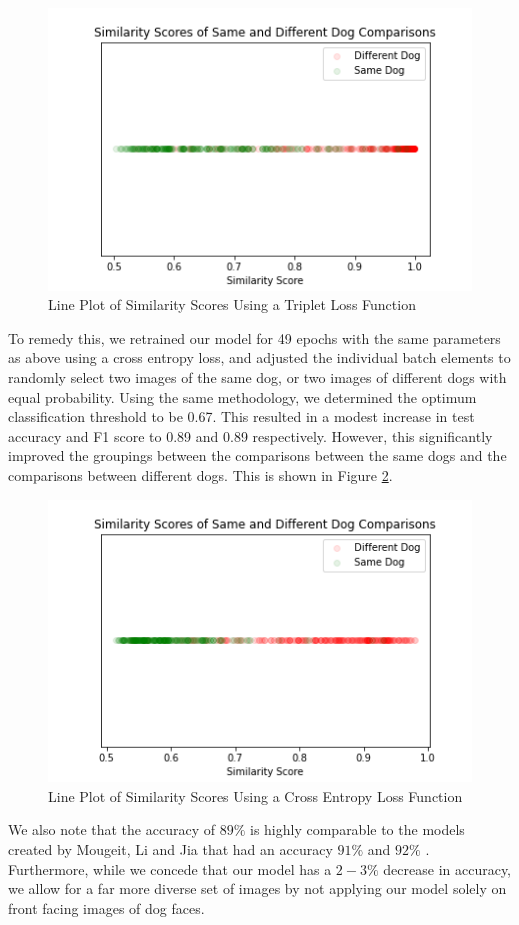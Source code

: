 \documentclass{article}
\begin{document}
\begin{figure}[h]
\centering
	\includegraphics[scale=0.7]{final-report-images/triplet_lineplot.png}
\caption{Line Plot of Similarity Scores Using a Triplet Loss Function}
\label{fig:x triplet lineplot}
\end{figure}
\noindent To remedy this, we retrained our model for 49 epochs with the same parameters as above using a cross entropy loss, and adjusted the individual batch elements to randomly select two images of the same dog, or two images of different dogs with equal probability.  Using the same methodology, we determined the optimum classification threshold to be 0.67.  This resulted in a modest increase in test accuracy and F1 score to 0.89 and 0.89 respectively.  However, this significantly improved the groupings between the comparisons between the same dogs and the comparisons between different dogs. This is shown in Figure \ref{fig:x triplet lineplot}. 

\begin{figure}[h]
\centering
	\includegraphics[scale=0.7]{final-report-images/crossentropy_lineplot.png}
\caption{Line Plot of Similarity Scores Using a Cross Entropy Loss Function}
\label{fig:x triplet lineplot}
\end{figure}
\noident We also note that the accuracy of $89\%$ is highly comparable to the models created by Mougeit, Li and Jia that had an accuracy $91\%$ and $92\%$ \cite{MougeotGuillaume2019ADLA}.  Furthermore, while we concede that our model has a $2-3\%$ decrease in accuracy, we allow for a far more diverse set of images by not applying our model solely on front facing images of dog faces.
\end{document}
